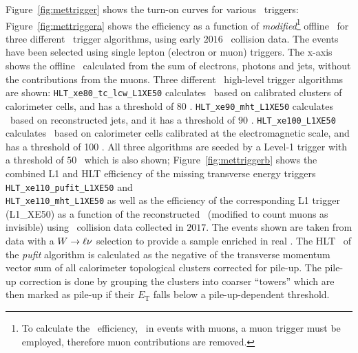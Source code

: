 					Figure~\ref{fig:mettrigger} shows the turn-on curves for various \met\ triggers: Figure~\ref{fig:mettriggera} shows the efficiency as a function of \textit{modified}\footnote{To calculate the \met\ efficiency, \eg\ in events with muons, a muon trigger must be employed, therefore muon contributions are removed.} offline \met\ for three different \met\ trigger algorithms, using early $2016$ \pp\ collision data. The events have been selected using single lepton (electron or muon) triggers. The x-axis shows the offline \met\ calculated from the sum of electrons, photons and jets, without the contributions from the muons. Three different \met\ high-level trigger algorithms are shown: \texttt{HLT\_xe80\_tc\_lcw\_L1XE50} calculates \met\ based on calibrated clusters of calorimeter cells, and has a threshold of 80 \GeV. \texttt{HLT\_xe90\_mht\_L1XE50} calculates \met\ based on reconstructed jets, and it has a threshold of $90$ \GeV. \texttt{HLT\_xe100\_L1XE50} calculates \met\ based on calorimeter cells calibrated at the electromagnetic scale, and has a threshold of 100 \GeV. All three algorithms are seeded by a Level-1 trigger with a threshold of $50$ \GeV\ which is also shown; Figure~\ref{fig:mettriggerb} shows the combined \ac{L1} and \ac{HLT} efficiency of the missing transverse energy triggers \texttt{HLT\_xe110\_pufit\_L1XE50} and \\ \texttt{HLT\_xe110\_mht\_L1XE50} as well as the efficiency of the corresponding \ac{L1} trigger (L1\_XE50) as a function of the reconstructed \met\ (modified to count muons as invisible) using \pp\ collision data collected in $2017$. The events shown are taken from data with a $W \rightarrow \ell \nu$ selection to provide a sample enriched in real \met. The \ac{HLT} \met\ of the \textit{pufit} algorithm is calculated as the negative of the transverse momentum vector sum of all calorimeter topological clusters corrected for pile-up. The pile-up correction is done by grouping the clusters into coarser “towers” which are then marked as pile-up if their $E_\mathrm{T}$ falls below a pile-up-dependent threshold.

